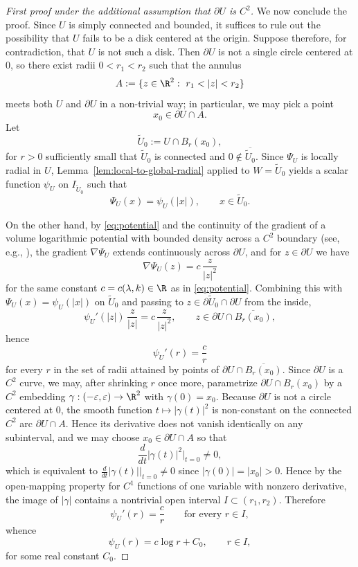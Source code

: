 \begin{proof}[First proof under the additional assumption that $\partial U$ is $C^2$]
We now conclude the proof. Since \(U\) is simply connected and bounded,
it suffices to rule out the possibility that \(U\) fails to be a disk
centered at the origin. Suppose therefore, for contradiction, that
\(U\) is not such a disk. Then \(\partial U\) is not a single circle
centered at $0$, so there exist radii \(0<r_1<r_2\) such that the
annulus
\[
A:=\{z\in \R^2:\ r_1<|z|<r_2\}
\]
meets both $U$ and $\partial U$ in a non-trivial way; in particular,
we may pick a point
\[
x_0\in \partial U\cap A.
\]
Let
\[
\widetilde{U}_0:=U\cap B_r(x_0),
\]
for $r>0$ sufficiently small that $\widetilde U_0$ is connected and
$0\notin \overline{\widetilde U_0}$. Since \(\Psi_U\) is locally radial
in \(U\), Lemma~\ref{lem:local-to-global-radial} applied to
$W=\widetilde U_0$ yields a scalar function \(\psi_U\) on
$I_{\widetilde U_0}$ such that
\[
\Psi_U(x)=\psi_U(|x|),\qquad x\in \widetilde{U}_0.
\]

On the other hand, by \eqref{eq:potential} and the continuity of the
gradient of a volume logarithmic potential with bounded density across
a $C^2$ boundary (see, e.g., \cite{Gustafsson,Isakov}), the gradient
$\nabla\Psi_U$ extends continuously across $\partial U$, and for
$z\in\partial U$ we have
\[
\nabla \Psi_U(z)=c\,\frac{z}{|z|^2}
\]
for the same constant $c=c(\lambda,k)\in \R$ as in
\eqref{eq:potential}. Combining this with $\Psi_U(x)=\psi_U(|x|)$ on
$\widetilde U_0$ and passing to $z\in \partial \widetilde U_0\cap
\partial U$ from the inside,
\[
\psi_U'(|z|)\,\frac{z}{|z|}=c\,\frac{z}{|z|^2},
\qquad z\in \partial U\cap \overline{B_r(x_0)},
\]
hence
\[
\psi_U'(r)=\frac{c}{r}
\]
for every $r$ in the set of radii attained by points of
$\partial U\cap \overline{B_r(x_0)}$. Since $\partial U$ is a $C^2$
curve, we may, after shrinking $r$ once more, parametrize
$\partial U\cap B_r(x_0)$ by a $C^2$ embedding
$\gamma:(-\varepsilon,\varepsilon)\to \R^2$ with $\gamma(0)=x_0$.
Because $\partial U$ is not a circle centered at $0$, the smooth
function $t\mapsto |\gamma(t)|^2$ is non-constant on the connected
$C^2$ arc $\partial U\cap A$. Hence its derivative does not vanish
identically on any subinterval, and we may choose $x_0\in\partial U\cap A$
so that
\[
\frac{d}{dt}|\gamma(t)|^2\Big|_{t=0}\ne 0,
\]
which is equivalent to $\frac{d}{dt}|\gamma(t)|\big|_{t=0}\ne 0$ since
$|\gamma(0)|=|x_0|>0$. Hence by the open-mapping
property for $C^1$ functions of one variable with nonzero derivative,
the image of $|\gamma|$ contains a nontrivial open interval
\(I\subset (r_1,r_2)\).
Therefore
\[
\psi_U'(r)=\frac{c}{r}
\qquad\text{for every }r\in I,
\]
whence
\[
\psi_U(r)=c\log r+C_0,
\qquad r\in I,
\]
for some real constant $C_0$.


\end{proof}
